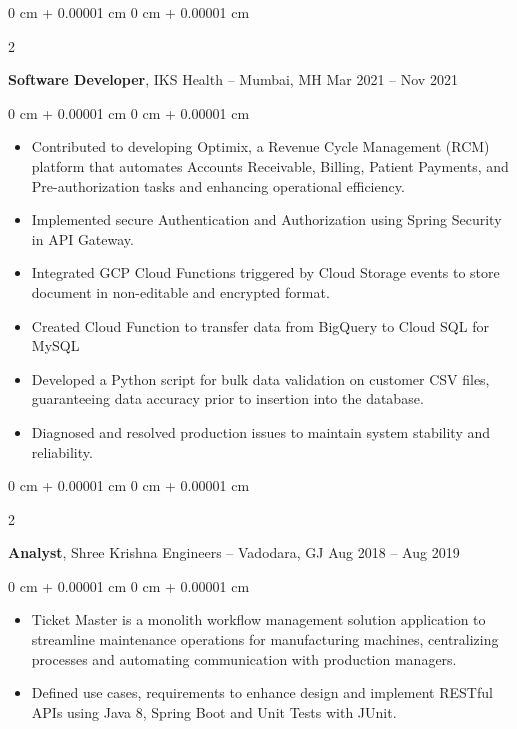 \documentclass[10pt, letterpaper]{article}
\newenvironment{highlights}{
    \begin{itemize}[
        topsep=0.10 cm,
        parsep=0.10 cm,
        partopsep=0pt,
        itemsep=0pt,
        leftmargin=0 cm + 10pt
    ]
}{
    \end{itemize}
} %
\newenvironment{onecolentry}{
    \begin{adjustwidth}{
        0 cm + 0.00001 cm
    }{
        0 cm + 0.00001 cm
    }
}{
    \end{adjustwidth}
} %
\newenvironment{twocolentry}[2][]{
    \onecolentry
    \def\secondColumn{#2}
    \setcolumnwidth{\fill, 4.5 cm}
    \begin{paracol}{2}
}{
    \switchcolumn \raggedleft \secondColumn
    \end{paracol}
    \endonecolentry
} %
\begin{document}
        \vspace{0.35 cm}



        \begin{twocolentry}{
            Mar 2021 – Nov 2021
        }
            \textbf{Software Developer}, IKS Health -- Mumbai, MH\end{twocolentry}

        \vspace{0.10 cm}
        \begin{onecolentry}
            \begin{highlights}
                \item Contributed to developing Optimix, a Revenue Cycle Management (RCM) platform that automates Accounts Receivable, Billing, Patient Payments, and Pre-authorization tasks and enhancing operational efficiency.
                \item Implemented secure Authentication and Authorization using Spring Security in API Gateway.
                \item Integrated GCP Cloud Functions triggered by Cloud Storage events to store document in non-editable and encrypted format.
                \item Created Cloud Function to transfer data from BigQuery to Cloud SQL for MySQL
                \item Developed a Python script for bulk data validation on customer CSV files, guaranteeing data accuracy prior to insertion into the database.
                \item Diagnosed and resolved production issues to maintain system stability and reliability.

            \end{highlights}
        \end{onecolentry}


        \vspace{0.35 cm}

        \begin{twocolentry}{
            Aug 2018 – Aug 2019
        }
            \textbf{Analyst}, Shree Krishna Engineers -- Vadodara, GJ\end{twocolentry}

        \vspace{0.10 cm}
        \begin{onecolentry}
            \begin{highlights}
                \item Ticket Master is a monolith workflow management solution application to streamline maintenance operations for manufacturing machines, centralizing processes and automating communication with production managers.
                \item Defined use cases, requirements to enhance design and implement RESTful APIs using Java 8, Spring Boot and Unit Tests with JUnit.

            \end{highlights}
        \end{onecolentry}
\end{document}

